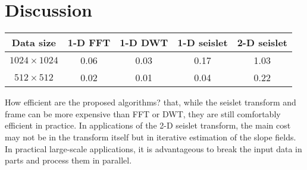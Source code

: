 

\section{Discussion}

{
    \begin{center}
     \begin{tabular}{|c|c|c|c|c|}
     \hline Data size & 1-D FFT & 1-D DWT & 1-D seislet & 2-D seislet \\
     \hline $1024 \times 1024$ & 0.06 & 0.03 & 0.17 & 1.03 \\
     \hline $512 \times 512$   & 0.02 & 0.01 & 0.04 & 0.22 \\
	\hline 
	\end{tabular} 
   \end{center}
}  

How efficient are the proposed algorithms? 
  that, while the seislet transform and frame can be more
expensive than FFT or DWT, they are still comfortably efficient in
practice. In applications of the 2-D seislet transform, the main cost
may not be in the transform itself but in iterative estimation of the
slope fields.  In practical large-scale applications, it is
advantageous to break the input data in parts and process them in
parallel.

